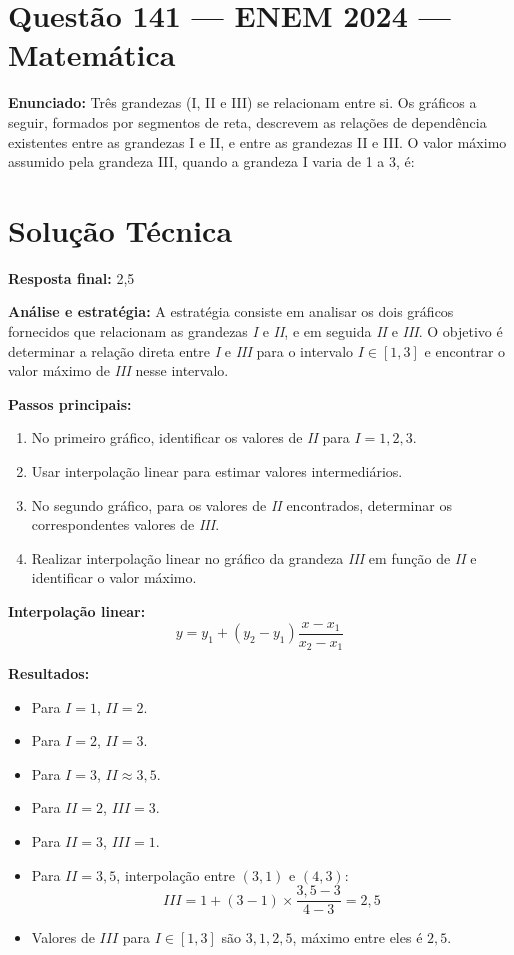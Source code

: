 \documentclass{article}
\begin{document}
\section*{Questão 141 — ENEM 2024 — Matemática}

\textbf{Enunciado:} Três grandezas (I, II e III) se relacionam entre si. Os gráficos a seguir, formados por segmentos de reta, descrevem as relações de dependência existentes entre as grandezas I e II, e entre as grandezas II e III. O valor máximo assumido pela grandeza III, quando a grandeza I varia de 1 a 3, é:

\section{Solução Técnica}
\textbf{Resposta final:} 2,5

\textbf{Análise e estratégia:}
A estratégia consiste em analisar os dois gráficos fornecidos que relacionam as grandezas \textit{I} e \textit{II}, e em seguida \textit{II} e \textit{III}. O objetivo é determinar a relação direta entre \textit{I} e \textit{III} para o intervalo \(I \in [1,3]\) e encontrar o valor máximo de \textit{III} nesse intervalo.

\textbf{Passos principais:}
\begin{enumerate}
\item No primeiro gráfico, identificar os valores de \textit{II} para \(I=1, 2, 3\).
\item Usar interpolação linear para estimar valores intermediários.
\item No segundo gráfico, para os valores de \textit{II} encontrados, determinar os correspondentes valores de \textit{III}.
\item Realizar interpolação linear no gráfico da grandeza \textit{III} em função de \textit{II} e identificar o valor máximo.
\end{enumerate}

\textbf{Interpolação linear:}
\[
y = y_1 + (y_2 - y_1) \frac{x - x_1}{x_2 - x_1}
\]

\textbf{Resultados:}
\begin{itemize}
\item Para \(I=1\), \(II=2\).
\item Para \(I=2\), \(II=3\).
\item Para \(I=3\), \(II \approx 3,5\).
\item Para \(II=2\), \(III=3\).
\item Para \(II=3\), \(III=1\).
\item Para \(II=3,5\), interpolação entre \((3,1)\) e \((4,3)\):
\[
III = 1 + (3-1)\times \frac{3,5-3}{4-3} = 2,5
\]
\item Valores de \(III\) para \(I\in[1,3]\) são \(3, 1, 2,5\), máximo entre eles é \(2,5\).
\end{itemize}
\end{document}
